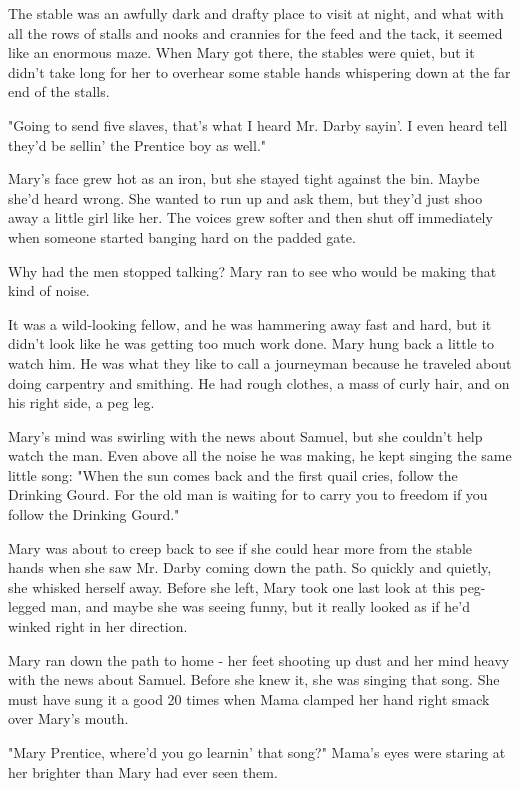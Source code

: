 The stable was an awfully dark and drafty place to visit at night, and what with all the rows of stalls and nooks and crannies for the feed and the tack, it seemed like an enormous maze. When Mary got there, the stables were quiet, but it didn't take long for her to overhear some stable hands whispering down at the far end of the stalls.

"Going to send five slaves, that's what I heard Mr. Darby sayin'. I even heard tell they'd be sellin' the Prentice boy as well."

Mary's face grew hot as an iron, but she stayed tight against the bin. Maybe she'd heard wrong. She wanted to run up and ask them, but they'd just shoo away a little girl like her. The voices grew softer and then shut off immediately when someone started banging hard on the padded gate.

Why had the men stopped talking? Mary ran to see who would be making that kind of noise.

It was a wild-looking fellow, and he was hammering away fast and hard, but it didn't look like he was getting too much work done. Mary hung back a little to watch him. He was what they like to call a journeyman because he traveled about doing carpentry and smithing. He had rough clothes, a mass of curly hair, and on his right side, a peg leg.

Mary's mind was swirling with the news about Samuel, but she couldn't help watch the man. Even above all the noise he was making, he kept singing the same little song: "When the sun comes back and the first quail cries, follow the Drinking Gourd. For the old man is waiting for to carry you to freedom if you follow the Drinking Gourd."

Mary was about to creep back to see if she could hear more from the stable hands when she saw Mr. Darby coming down the path. So quickly and quietly, she whisked herself away. Before she left, Mary took one last look at this peg-legged man, and maybe she was seeing funny, but it really looked as if he'd winked right in her direction.

Mary ran down the path to home - her feet shooting up dust and her mind heavy with the news about Samuel. Before she knew it, she was singing that song. She must have sung it a good 20 times when Mama clamped her hand right smack over Mary's mouth.

"Mary Prentice, where'd you go learnin' that song?" Mama's eyes were staring at her brighter than Mary had ever seen them.

